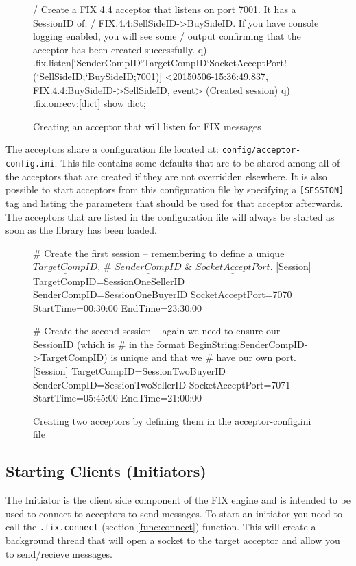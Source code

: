 \begin{figure}[H]
\begin{qcode}
/ Create a FIX 4.4 acceptor that listens on port 7001. It has a SessionID of:
/ FIX.4.4:SellSideID->BuySideID. If you have console logging enabled, you will see some
/ output confirming that the acceptor has been created successfully.
q) .fix.listen[`SenderCompID`TargetCompID`SocketAcceptPort!(`SellSideID;`BuySideID;7001)]
<20150506-15:36:49.837, FIX.4.4:BuySideID->SellSideID, event>
(Created session)
q) .fix.onrecv:{[dict] show dict; }
\end{qcode}
\caption{Creating an acceptor that will listen for FIX messages}
\end{figure}

The acceptors share a configuration file located at: \verb|config/acceptor-config.ini|. This file contains some defaults that are to be shared among all of the acceptors that are created if they are not overridden elsewhere. It is also possible to start acceptors from this configuration file by specifying a \verb|[SESSION]| tag and listing the parameters that should be used for that acceptor afterwards. The acceptors that are listed in the configuration file will always be started as soon as the library has been loaded.

\begin{figure}[H]
\begin{inicode}
# Create the first session -- remembering to define a unique $\underline{TargetCompID}$,
# $\underline{SenderCompID}$ & $\underline{SocketAcceptPort}$.
[Session]
TargetCompID=SessionOneSellerID
SenderCompID=SessionOneBuyerID
SocketAcceptPort=7070
StartTime=00:30:00
EndTime=23:30:00

# Create the second session -- again we need to ensure our SessionID (which is
# in the format BeginString:SenderCompID->TargetCompID) is unique and that we
# have our own port.
[Session]
TargetCompID=SessionTwoBuyerID
SenderCompID=SessionTwoSellerID
SocketAcceptPort=7071
StartTime=05:45:00
EndTime=21:00:00
\end{inicode}
\caption{Creating two acceptors by defining them in the acceptor-config.ini file}
\end{figure}

\subsection{Starting Clients (Initiators)}

The Initiator is the client side component of the FIX engine and is intended to be used to connect to acceptors to send messages. To start an initiator you need to call the \texttt{.fix.connect} (section \ref{func:connect}) function. This will create a background thread that will open a socket to the target acceptor and allow you to send/recieve messages.

